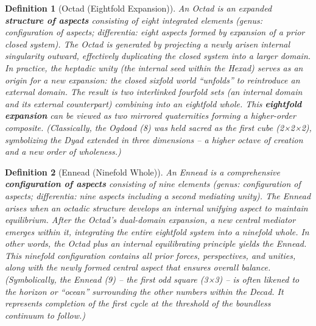 \documentclass[11pt]{article}
\newtheorem{definition}{Definition}
\theoremstyle{plain}
\begin{document}
\begin{definition}[Octad (Eightfold Expansion)]
An \emph{Octad} is an expanded \textbf{structure of aspects} consisting of eight integrated elements \textit{(genus: configuration of aspects; differentia: eight aspects formed by expansion of a prior closed system)}. The Octad is generated by projecting a newly arisen internal singularity outward, effectively duplicating the closed system into a larger domain. In practice, the heptadic unity (the internal seed within the Hexad) serves as an origin for a new expansion: the closed sixfold world “unfolds” to reintroduce an external domain. The result is two interlinked fourfold sets (an internal domain and its external counterpart) combining into an eightfold whole. This \textbf{eightfold expansion} can be viewed as two mirrored quaternities forming a higher-order composite. \textit{(Classically, the Ogdoad (8) was held sacred as the first cube (2×2×2), symbolizing the Dyad extended in three dimensions – a higher octave of creation and a new order of wholeness.)}
\end{definition}

\begin{definition}[Ennead (Ninefold Whole)]
An \emph{Ennead} is a comprehensive \textbf{configuration of aspects} consisting of nine elements \textit{(genus: configuration of aspects; differentia: nine aspects including a second mediating unity)}. The Ennead arises when an octadic structure develops an internal unifying aspect to maintain equilibrium. After the Octad’s dual-domain expansion, a new central mediator emerges within it, integrating the entire eightfold system into a ninefold whole. In other words, the Octad plus an internal equilibrating principle yields the Ennead. This ninefold configuration contains all prior forces, perspectives, and unities, along with the newly formed central aspect that ensures overall balance. \textit{(Symbolically, the Ennead (9) – the first odd square (3×3) – is often likened to the horizon or “ocean” surrounding the other numbers within the Decad. It represents completion of the first cycle at the threshold of the boundless continuum to follow.)}
\end{definition}
\end{document}
